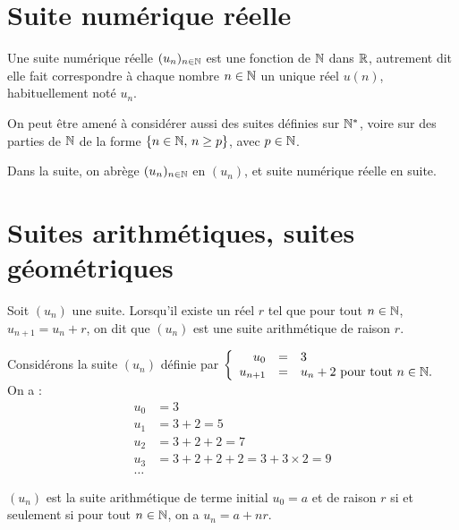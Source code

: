 \documentclass[a4paper,10pt,DIV18,BCOR0mm]{scrartcl}
\begin{document}
\section{Suite numérique réelle}
 \begin{definition}
 Une suite numérique réelle $(u_n)_{n\in\mathbb{N}}$ est une fonction de $\mathbb{N}$ dans $\mathbb{R}$, autrement dit
elle fait correspondre à chaque nombre $n\in\mathbb{N}$ un unique réel $u(n)$, habituellement noté $u_n$.
\end{definition}
On peut être amené à considérer aussi des suites définies sur $\mathbb{N}^*$, voire sur des parties de $\mathbb{N}$ de
la forme $\{n\in\mathbb{N},\,n\geq p\}$, avec $p\in\mathbb{N}$.

Dans la suite, on abrège $(u_n)_{n\in\mathbb{N}}$ en $(u_n)$, et \og suite numérique réelle\fg{} en \og suite\fg.




\section{Suites arithmétiques, suites géométriques}
\begin{definition}
 Soit $(u_n)$ une suite. Lorsqu'il existe un réel $r$ tel que pour tout 
$n\in\mathbb{N}$, $u_{n+1}=u_n+r$, on dit que $(u_n)$ est une suite arithmétique de 
raison $r$.
\end{definition}
\begin{exemple}
 Considérons la suite $(u_n)$ définie par
$\left\{
\begin{array}{rcl}
 u_0&=&3\\
 u_{n+1}&=&u_n+2\text{ pour tout $n\in\mathbb{N}$.}
\end{array}
\right.$ 
On a :
\begin{align*}
 u_0&=3\\
 u_1&=3+2=5\\
 u_2&=3+2+2=7\\
 u_3&=3+2+2+2=3+3\times2=9\\
\dots
\end{align*}
\end{exemple}



\begin{theoreme}
$(u_n)$ est la suite arithmétique de terme initial $u_0=a$ et de raison $r$ si et seulement si pour tout $n\in\mathbb{N}$, on a $u_n=a+nr$.
\end{theoreme}
\end{document}
